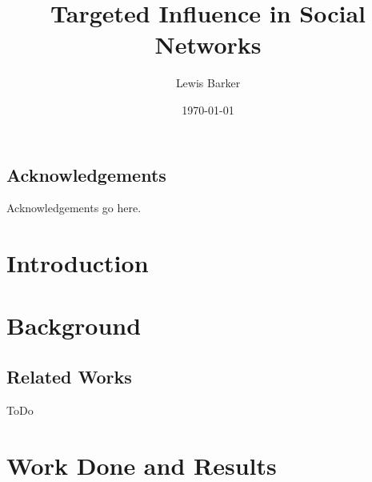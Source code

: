 \documentclass[bsc,frontabs,twoside,singlespacing,parskip,deptreport]{infthesis}     %
\begin{document}
\title{Targeted Influence in Social Networks}

\author{Lewis Barker}



\date{\today}


\maketitle

\section*{Acknowledgements}
Acknowledgements go here. 

\tableofcontents



\chapter{Introduction}


\chapter{Background}
\section{Related Works}
ToDo

\chapter{Work Done and Results}
\end{document}
